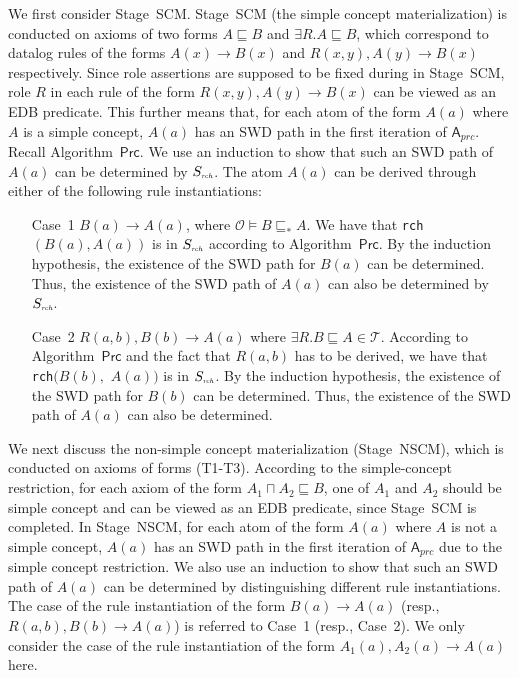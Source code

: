 \documentclass[final,1p,times]{elsarticle}
\begin{document}
We first consider Stage~SCM.
Stage~SCM (the simple concept materialization) is conducted on axioms of two forms $A\sqsubseteq B$
and $\exists R.A\sqsubseteq B$, which correspond to datalog rules of the forms $A(x)\rightarrow B(x)$
and $R(x,y),A(y)\rightarrow B(x)$ respectively. Since role assertions are supposed to be fixed
during in Stage~SCM, role $R$ in each rule of the form $R(x,y),A(y)\rightarrow B(x)$
can be viewed as an EDB predicate. This further means that,
for each atom of the form $A(a)$ where $A$ is a simple concept,
$A(a)$ has an SWD path in the first iteration of $\mathsf{A}_{prc}$.
Recall Algorithm~$\mathsf{Prc}$. We use an induction to show that
such an SWD path of $A(a)$ can be determined by $S_{\textit{\tiny rch}}$.
The atom $A(a)$ can be derived through either of the following rule instantiations:

\begin{enumerate}[leftmargin=12ex]
\item[Case~1] $B(a)\rightarrow A(a)$, where $\mathcal{O}\models B\sqsubseteq_* A$. We have
    that \texttt{rch}$(B(a),A(a))$ is in $S_{\textit{\tiny rch}}$ according to Algorithm~$\mathsf{Prc}$.
    By the induction hypothesis, the existence of the SWD path for $B(a)$ can be determined.
    Thus, the existence of the SWD path of $A(a)$ can also be determined by $S_{\textit{\tiny rch}}$.

\item[Case~2] $R(a,b),B(b)\rightarrow A(a)$ where $\exists R.B\sqsubseteq A\in\mathcal{T}$.
    According to Algorithm~$\mathsf{Prc}$ and the fact that $R(a,b)$ has to be derived,
    we have that \texttt{rch}$(B(b),$ $A(a))$ is in $S_{\textit{\tiny rch}}$.
    By the induction hypothesis, the existence of the SWD path for $B(b)$ can be determined.
    Thus, the existence of the SWD path of $A(a)$ can also be determined.
\end{enumerate}

We next discuss the non-simple concept materialization (Stage~NSCM), which is conducted on axioms of forms (T1-T3).
According to the simple-concept restriction, for each axiom of the form $A_1\sqcap A_2\sqsubseteq B$,
one of $A_1$ and $A_2$ should be simple concept and can be viewed as an EDB predicate, since Stage~SCM is completed.
In Stage~NSCM, for each atom of the form $A(a)$ where $A$ is not a simple concept,
$A(a)$ has an SWD path in the first iteration of $\mathsf{A}_{prc}$ due to the simple concept restriction.
We also use an induction to show that
such an SWD path of $A(a)$ can be determined by distinguishing different rule instantiations.
The case of the rule instantiation of the form $B(a)\rightarrow A(a)$ (resp., $R(a,b),B(b)\rightarrow A(a)$)
is referred to Case~1 (resp., Case~2). We only consider the case of the rule instantiation of the form $A_1(a),A_2(a)\rightarrow A(a)$
here.
\end{document}
